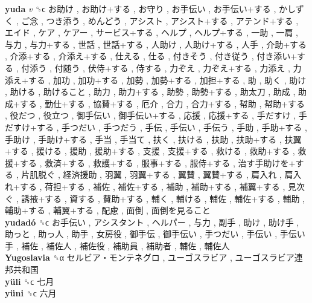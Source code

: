 \textbf{yuda} \emph{v}  ␝ϲ   お助け ,  お助け+する ,  お守り ,  お手伝い ,  お手伝い+する ,  かしずく ,  ご念 ,  つき添う ,  めんどう ,  アシスト ,  アシスト+する ,  アテンド+する ,  エイド ,  ケア ,  ケアー ,  サービス+する ,  ヘルプ ,  ヘルプ+する ,  一助 ,  一肩 ,  与力 ,  与力+する ,  世話 ,  世話+する ,  人助け ,  人助け+する ,  人手 ,  介助+する ,  介添+する ,  介添え+する ,  仕える ,  仕る ,  付きそう ,  付き従う ,  付き添い+する ,  付添う ,  付随う ,  伏侍+する ,  侍する ,  力ぞえ ,  力ぞえ+する ,  力添え ,  力添え+する ,  加功 ,  加功+する ,  加勢 ,  加勢+する ,  加担+する ,  助 ,  助く ,  助け ,  助ける ,  助けること ,  助力 ,  助力+する ,  助勢 ,  助勢+する ,  助太刀 ,  助成 ,  助成+する ,  勤仕+する ,  協賛+する ,  厄介 ,  合力 ,  合力+する ,  幇助 ,  幇助+する ,  役だつ ,  役立つ ,  御手伝い ,  御手伝い+する ,  応援 ,  応援+する ,  手だすけ ,  手だすけ+する ,  手つだい ,  手つだう ,  手伝 ,  手伝い ,  手伝う ,  手助 ,  手助+する ,  手助け ,  手助け+する ,  手当 ,  手当て ,  扶く ,  扶ける ,  扶助 ,  扶助+する ,  扶翼+する ,  援ける ,  援助 ,  援助+する ,  支援 ,  支援+する ,  救ける ,  救助+する ,  救援+する ,  救済+する ,  救護+する ,  服事+する ,  服侍+する ,  治す手助けを+する ,  片肌脱ぐ ,  経済援助 ,  羽翼 ,  羽翼+する ,  翼賛 ,  翼賛+する ,  肩入れ ,  肩入れ+する ,  荷担+する ,  補佐 ,  補佐+する ,  補助 ,  補助+する ,  補翼+する ,  見次ぐ ,  誘掖+する ,  資する ,  賛助+する ,  輔く ,  輔ける ,  輔佐 ,  輔佐+する ,  輔助 ,  輔助+する ,  輔翼+する ,  配慮 ,  面倒 ,  面倒を見ること   \\
\textbf{yudadó} ␝ϲ   お手伝い ,  アシスタント ,  ヘルパー ,  与力 ,  副手 ,  助け ,  助け手 ,  助っと ,  助っ人 ,  助手 ,  女房役 ,  御手伝 ,  御手伝い ,  手つだい ,  手伝い ,  手伝い手 ,  補佐 ,  補佐人 ,  補佐役 ,  補助員 ,  補助者 ,  輔佐 ,  輔佐人   \\
\textbf{Yugoslavia} ␝α   セルビア・モンテネグロ ,  ユーゴスラビア ,  ユーゴスラビア連邦共和国   \\
\textbf{yüli} ␝ϲ   七月   \\
\textbf{yüni} ␝ϲ   六月   \\

